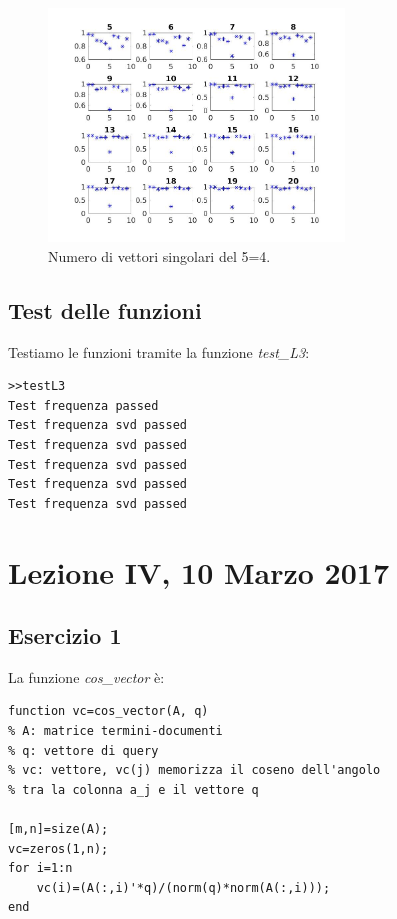 \documentclass[11pt,a4paper,twoside,openright,titlepage,
                           headinclude,footinclude,BCOR5mm,
                           numbers=noenddot,cleardoublepage=empty,
                           tablecaptionabove]{scrbook}
\begin{document}
\begin{figure}[b!]
\begin{center}
\includegraphics[width=0.7\textwidth]{figs/percent_cifre2.jpg}
\caption{Numero di vettori singolari del 5=4.}
\end{center}
\end{figure}
\newpage
\section{Test delle funzioni}
Testiamo le funzioni tramite la funzione \emph{test\_L3}:
\begin{lstlisting}[frame=lines]
>>testL3
Test frequenza passed
Test frequenza svd passed
Test frequenza svd passed
Test frequenza svd passed
Test frequenza svd passed
Test frequenza svd passed
\end{lstlisting}

\chapter{Lezione IV, 10 Marzo 2017}
\section{Esercizio 1}
La funzione \emph{cos\_vector} è:
\begin{lstlisting}[frame=trBL]
function vc=cos_vector(A, q)
% A: matrice termini-documenti
% q: vettore di query
% vc: vettore, vc(j) memorizza il coseno dell'angolo
% tra la colonna a_j e il vettore q

[m,n]=size(A);
vc=zeros(1,n);
for i=1:n
    vc(i)=(A(:,i)'*q)/(norm(q)*norm(A(:,i)));
end
\end{lstlisting}
\end{document}
